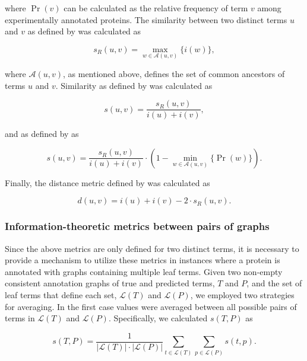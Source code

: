 \noindent
where $\Pr(v)$ can be calculated as the relative frequency of term $v$ among experimentally annotated proteins. The similarity between two distinct terms $u$ and $v$ as defined by \citet{Resnik1995} was calculated as

\begin{equation}
s_{R}(u,v)=\underset{w\in \mathcal{A}(u,v)}{\max}\{i(w)\},
\end{equation}

\noindent where $\mathcal{A}(u, v)$, as mentioned above, defines the set of common ancestors of terms $u$ and $v$. Similarity as defined by \citet{Lin1998} was calculated as

\begin{equation}
s(u,v)=\frac{s_{R}(u,v)}{i(u)+i(v)},
\end{equation}

\noindent and as defined by \citet{Schlicker2006} as

\begin{equation}
s(u,v)=\frac{s_{R}(u,v)}{i(u)+i(v)}\cdot(1-\underset{w\in \mathcal{A}(u,v)}{\min}\{\Pr(w)\}).
\end{equation}

\noindent Finally, the distance metric defined by \citet{Jiang1997} was calculated as

\begin{equation}
d(u,v)=i(u)+i(v)-2 \cdot s_{R}(u,v).
\end{equation}

\subsubsection{Information-theoretic metrics between pairs of graphs}
\label{sec:averaging}


Since the above metrics are only defined for two distinct terms, it is necessary to provide a mechanism to utilize these metrics in instances where a protein is annotated with graphs containing multiple leaf terms. Given two non-empty consistent annotation graphs of true and predicted terms, $T$ and $P$, and the set of leaf terms that define each set, $\mathcal{L}(T)$ and $\mathcal{L}(P)$, we employed two strategies for averaging. In the first case values were averaged between all possible pairs of terms in $\mathcal{L}(T)$ and $\mathcal{L}(P)$. Specifically, we calculated $s(T,P)$ as 

\begin{equation}
s(T, P)=\frac{1}{|\mathcal{L}(T)|\cdot|\mathcal{L}(P)|}\underset{t\in\mathcal{L}(T)}{\sum}\underset{p\in\mathcal{L}(P)}{\sum}s(t,p).
\end{equation}

